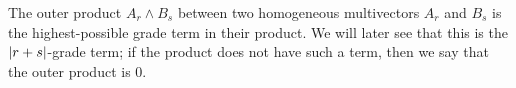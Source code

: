 \begin{definition}\label{d:outer-product1}
	The outer product $A_r \wedge B_s$ between two homogeneous multivectors $A_r$ and $B_s$ is the highest-possible grade term in their product. We will later see that this is the $\left|r+s\right|$-grade term; if the product does not have such a term, then we say that the outer product is 0.
\end{definition}
